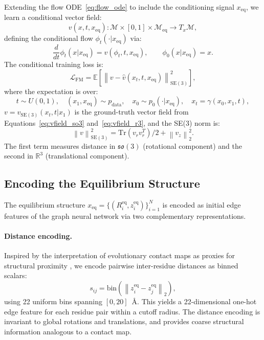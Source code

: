 \documentclass[12pt,a4paper]{article}
\newcommand{\xeq}{x_{\mathrm{eq}}}
\newcommand{\Meq}{\mathcal{M}_{\mathrm{eq}}}
\newcommand{\SE}{\mathrm{SE}(3)}
\newcommand{\Rthree}{\mathbb{R}^3}
\newcommand{\pdata}{p_{\mathrm{data}}}
\newcommand{\Loss}{\mathcal{L}}
\newcommand{\vhat}{\hat{v}}
\newcommand{\norm}[1]{\left\|#1\right\|}
\begin{document}
Extending the flow ODE~\eqref{eq:flow_ode} to include the conditioning signal $\xeq$, we
learn a conditional vector field:
\begin{equation}
  \label{eq:cond_vfield}
  v(x, t, \xeq): \mathcal{M} \times [0,1] \times \Meq \to T_x \mathcal{M},
\end{equation}
defining the conditional flow $\phi_t(\cdot | \xeq)$ via:
\begin{equation}
  \label{eq:cond_flow_ode}
  \frac{d}{dt}\phi_t(x | \xeq) = v(\phi_t, t, \xeq), \qquad \phi_0(x|\xeq) = x.
\end{equation}
The conditional training loss is:
\begin{equation}
  \label{eq:cond_fm_loss}
  \Loss_{\mathrm{FM}} = \mathbb{E}\!\left[\norm{v - \vhat(x_t, t, \xeq)}^2_{\SE}\right],
\end{equation}
where the expectation is over:
\begin{equation}
  t \sim U(0,1), \quad (x_1, \xeq) \sim \pdata, \quad x_0 \sim p_0(\cdot|\xeq),
  \quad x_t = \gamma(x_0, x_1, t),
\end{equation}
$v = v_{\SE}(x_t, t | x_1)$ is the ground-truth vector field from Equations~\eqref{eq:vfield_so3}
and~\eqref{eq:vfield_r3}, and the SE(3) norm is:
\begin{equation}
  \label{eq:se3_norm}
  \norm{v}^2_{\SE} = \mathrm{Tr}(v_r v_r^T)/2 + \norm{v_z}^2_2.
\end{equation}
The first term measures distance in $\mathfrak{so}(3)$ (rotational component) and the second
in $\Rthree$ (translational component).

\subsection{Encoding the Equilibrium Structure}
\label{sec:encoding}

The equilibrium structure $\xeq = \{(R^{\mathrm{eq}}_i, z^{\mathrm{eq}}_i)\}_{i=1}^N$ is
encoded as initial edge features of the graph neural network via two complementary representations.

\paragraph{Distance encoding.}
Inspired by the interpretation of evolutionary contact maps as proxies for structural
proximity \citep{lin2023}, we encode pairwise inter-residue distances as binned scalars:
\begin{equation}
  \label{eq:dist_enc}
  s_{ij} = \mathrm{bin}\!\left(\norm{z^{\mathrm{eq}}_i - z^{\mathrm{eq}}_j}_2\right),
\end{equation}
using 22 uniform bins spanning $[0, 20]$~Å.  This yields a 22-dimensional one-hot
edge feature for each residue pair within a cutoff radius.  The distance encoding is
invariant to global rotations and translations, and provides coarse structural information
analogous to a contact map.
\end{document}
